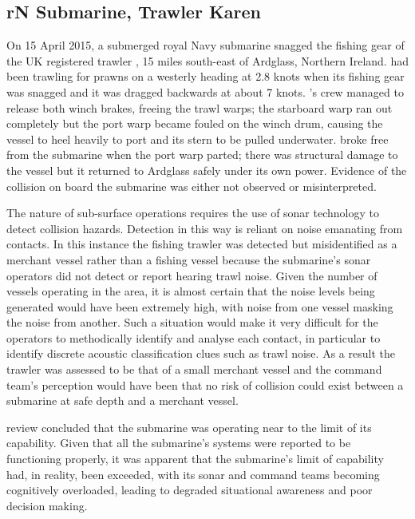 \subsection{rN Submarine, Trawler Karen} \label{bkm:incacc:subtrawler}
On 15 April 2015, a submerged royal Navy submarine snagged the fishing gear of the UK registered trawler , 15 miles south-east of Ardglass, Northern Ireland.  had been trawling for prawns on a westerly heading at 2.8 knots when its fishing gear was snagged and it was dragged backwards at about 7 knots. 's crew managed to release both winch brakes, freeing the trawl warps; the starboard warp ran out completely but the port warp became fouled on the winch drum, causing the vessel to heel heavily to port and its stern to be pulled underwater.  broke free from the submarine when the port warp parted; there was structural damage to the vessel but it returned to Ardglass safely under its own power. Evidence of the collision on board the submarine was either not observed or misinterpreted. 

The nature of sub-surface operations requires the use of sonar technology to detect collision hazards. Detection in this way is reliant on noise emanating from contacts. In this instance the fishing trawler was detected but misidentified as a merchant vessel rather than a fishing vessel because the submarine's sonar operators did not detect or report hearing trawl noise. Given the number of vessels operating in the area, it is almost certain that the noise levels being generated would have been extremely high, with noise from one vessel masking the noise from another. Such a situation would make it very difficult for the  operators to methodically identify and analyse each contact, in particular to identify discrete acoustic classification clues such as trawl noise. As a result the trawler was assessed to be that of a small merchant vessel and the command team's perception would have been that no risk of collision could exist between a submarine at safe depth and a merchant vessel. 

review concluded that the submarine was operating near to the limit of its capability. Given that all the submarine's systems were reported to be functioning properly, it was apparent that the submarine's limit of capability had, in reality, been exceeded, with its sonar and command teams becoming cognitively overloaded, leading to degraded situational awareness and poor decision making.

